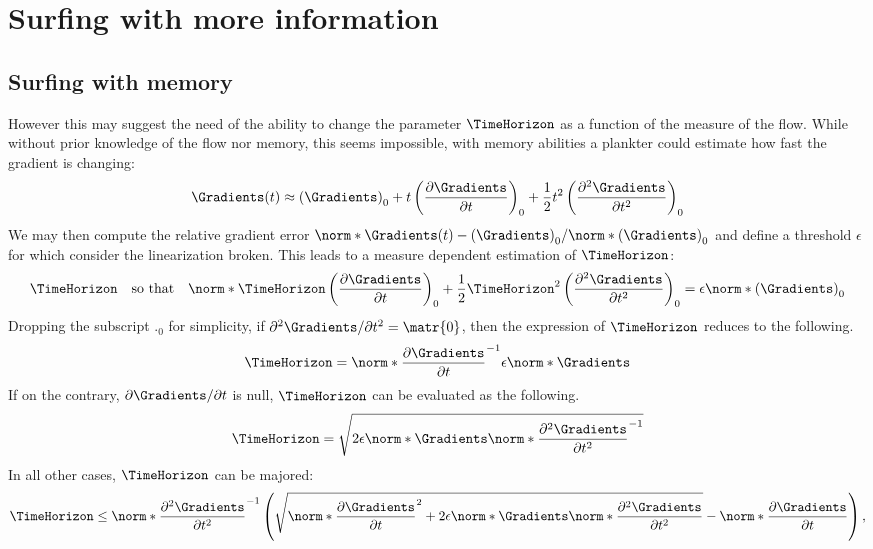 \chapter{Surfing with more information}\label{chap:more_information}

\section{Surfing with memory}\label{sec:memory}

However this may suggest the need of the ability to change the parameter $\TimeHorizon$ as a function of the measure of the flow.
While without prior knowledge of the flow nor memory, this seems impossible, with memory abilities a plankter could estimate how fast the gradient is changing:
\begin{equation}
 	\Gradients(t) \approx \left( \Gradients \right)_0 + t \left( \frac{\partial \Gradients}{\partial t} \right)_0 + \frac{1}{2} t^2 \left( \frac{\partial^2 \Gradients}{\partial t^2} \right)_0
\end{equation}
We may then compute the relative gradient error $\norm*{\Gradients(t) - \left( \Gradients \right)_0} / \norm*{\left( \Gradients \right)_0}$ and define a threshold $\epsilon$ for which consider the linearization broken. 
This leads to a measure dependent estimation of $\TimeHorizon$:
\begin{equation}
 	\TimeHorizon \quad \text{so that} \quad \norm*{\TimeHorizon \left( \frac{\partial \Gradients}{\partial t} \right)_0 + \frac{1}{2} \TimeHorizon^2 \left( \frac{\partial^2 \Gradients}{\partial t^2} \right)_0} = \epsilon \norm*{\left( \Gradients \right)_0}
\end{equation}
Dropping the subscript $._0$ for simplicity, if $\partial^2 \Gradients / \partial t^2 = \matr{0}$, then the expression of $\TimeHorizon$ reduces to the following.
\begin{equation}
	\label{eq:time_horizon_based_on_a_time_derivative_first_order}
	\TimeHorizon = \norm*{\frac{\partial \Gradients}{\partial t}}^{-1} \epsilon \norm*{\Gradients}
\end{equation}
If on the contrary, $\partial \Gradients / \partial t$ is null, $\TimeHorizon$ can be evaluated as the following.
\begin{equation}
	\TimeHorizon = \sqrt{2 \epsilon \norm*{\Gradients} \norm*{\frac{\partial^2 \Gradients}{\partial t^2}}^{-1}}
\end{equation}
In all other cases, $\TimeHorizon$ can be majored:
\begin{equation}
	\TimeHorizon \le \norm*{\frac{\partial^2 \Gradients}{\partial t^2}}^{-1} \left( \sqrt{\norm*{\frac{\partial \Gradients}{\partial t}}^2 + 2 \epsilon \norm*{\Gradients} \norm*{\frac{\partial^2 \Gradients}{\partial t^2}}} - \norm*{\frac{\partial \Gradients}{\partial t}} \right),
\end{equation}
